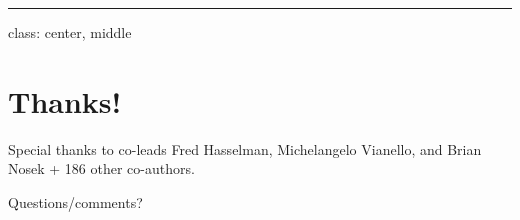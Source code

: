 \documentclass[]{article}
\begin{document}
\begin{center}\rule{0.5\linewidth}{\linethickness}\end{center}

class: center, middle

\section{Thanks!}\label{thanks}

Special thanks to co-leads Fred Hasselman, Michelangelo Vianello, and
Brian Nosek + 186 other co-authors.

Questions/comments?

~~~~~~
\end{document}
